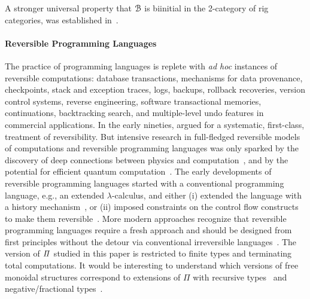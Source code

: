 A stronger universal property that $\BFin$ is biinitial in the 2-category of rig categories, was established
in~\cite{elguetaGroupoidFiniteSets2021}.

\paragraph{Reversible Programming Languages} The practice of programming languages is replete with \emph{ad hoc}
instances of reversible computations: database transactions, mechanisms for data provenance, checkpoints, stack and
exception traces, logs, backups, rollback recoveries, version control systems, reverse engineering, software
transactional memories, continuations, backtracking search, and multiple-level undo features in commercial
applications. In the early nineties, \citet{Baker:1992:LLL,Baker:1992:NFT} argued for a systematic, first-class,
treatment of reversibility. But intensive research in full-fledged reversible models of computations and reversible
programming languages was only sparked by the discovery of deep connections between physics and
computation~\cite{Landauer:1961,PhysRevA.32.3266,Toffoli:1980,bennett1985fundamental,Frank:1999:REC:930275,Hey:1999:FCE:304763,fredkin1982conservative},
and by the potential for efficient quantum computation~\cite{springerlink:10.1007/BF02650179}. The early developments of
reversible programming languages started with a conventional programming language, e.g., an extended $\lambda$-calculus,
and either (i) extended the language with a history
mechanism~\cite{vanTonder:2004,Kluge:1999:SEMCD,lorenz,danos2004reversible}, or (ii) imposed constraints on the control
flow constructs to make them reversible~\cite{Yokoyama:2007:RPL:1244381.1244404}.  More modern approaches recognize that
reversible programming languages require a fresh approach and should be designed from first principles without the
detour via conventional irreversible
languages~\cite{Yokoyama:2008:PRP,Mu:2004:ILRC,abramsky2005structural,DiPierro:2006:RCL:1166042.1166047}. The version of
$\mathit{\Pi}$ studied in this paper is restricted to finite types and terminating total computations. It would be
interesting to understand which versions of free monoidal structures correspond to extensions of $\Pi$ with recursive
types~\cite{jamesInformationEffects2012,rc2011} and negative/fractional
types~\cite{chenComputationalInterpretationCompact2021}.

